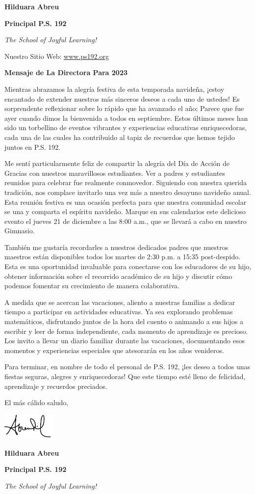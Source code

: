 \documentclass[11pt,letterpaper]{article}
\begin{document}
\textbf{Hilduara Abreu}

\textbf{Principal P.S. 192}

\textit{The School of Joyful Learning!}

\newpage
\vspace*{.5in}
Nuestro Sitio Web: \href{https://www.ps192.org/apps/pages/index.jsp?uREC_ID=1504973&type=d&pREC_ID=2359028}{www.ps192.org}

\textbf{Mensaje de La Directora Para 2023}

Mientras abrazamos la alegría festiva de esta temporada navideña, ¡estoy encantado de extender nuestros más sinceros deseos a cada uno de ustedes! Es sorprendente reflexionar sobre lo rápido que ha avanzado el año; Parece que fue ayer cuando dimos la bienvenida a todos en septiembre. Estos últimos meses han sido un torbellino de eventos vibrantes y experiencias educativas enriquecedoras, cada una de las cuales ha contribuido al tapiz de recuerdos que hemos tejido juntos en P.S. 192.

Me sentí particularmente feliz de compartir la alegría del Día de Acción de Gracias con nuestros maravillosos estudiantes. Ver a padres y estudiantes reunidos para celebrar fue realmente conmovedor. Siguiendo con nuestra querida tradición, nos complace invitarlo una vez más a nuestro desayuno navideño anual. Esta reunión festiva es una ocasión perfecta para que nuestra comunidad escolar se una y comparta el espíritu navideño. Marque en sus calendarios este delicioso evento el jueves 21 de diciembre a las 8:00 a.m., que se llevará a cabo en nuestro Gimnasio.

También me gustaría recordarles a nuestros dedicados padres que nuestros maestros están disponibles todos los martes de 2:30 p.m. a 15:35 post-despido. Esta es una oportunidad invaluable para conectarse con los educadores de su hijo, obtener información sobre el recorrido académico de su hijo y discutir cómo podemos fomentar su crecimiento de manera colaborativa.

A medida que se acercan las vacaciones, aliento a nuestras familias a dedicar tiempo a participar en actividades educativas. Ya sea explorando problemas matemáticos, disfrutando juntos de la hora del cuento o animando a sus hijos a escribir y leer de forma independiente, cada momento de aprendizaje es precioso. Los invito a llevar un diario familiar durante las vacaciones, documentando esos momentos y experiencias especiales que atesorarán en los años venideros.

Para terminar, en nombre de todo el personal de P.S. 192, ¡les deseo a todos unas fiestas seguras, alegres y enriquecedoras! Que este tiempo esté lleno de felicidad, aprendizaje y recuerdos preciados.

El más cálido saludo,

\includegraphics[width=0.2\textwidth]{hil_signature}

\textbf{Hilduara Abreu}

\textbf{Principal P.S. 192}

\textit{The School of Joyful Learning!}
\end{document}
